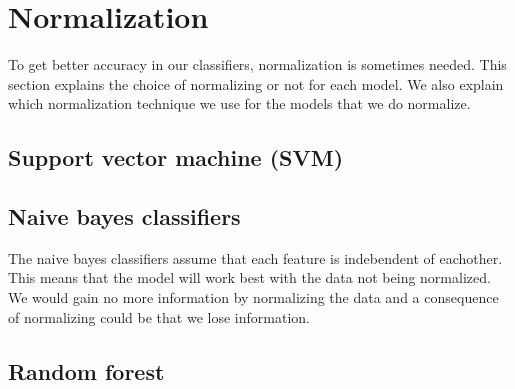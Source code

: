 \section{Normalization}

To get better accuracy in our classifiers, normalization is sometimes needed. This section explains the choice of normalizing or not for each model. We also explain which normalization technique we use for the models that we do normalize.

\subsection{Support vector machine (SVM)}

\subsection{Naive bayes classifiers}

The naive bayes classifiers assume that each feature is indebendent of eachother. This means that the model will work best with the data not being normalized. We would gain no more information by normalizing the data and a consequence of normalizing could be that we lose information.

\subsection{Random forest}